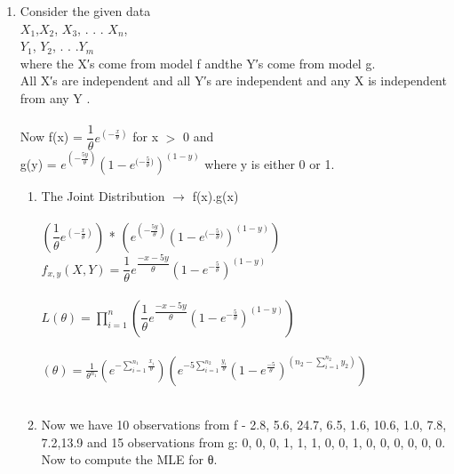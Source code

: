 \documentclass[11pt]{article}
\begin{document}
\begin{enumerate}
\begin{enumerate}
\end{enumerate}


\item Consider the given data\\
 ${X_1}$,${ X_2}$, ${X_3}$, . . . ${X_n}$,\\
$ {Y_1}$, ${Y_2}$, . . .${ Y_m}$\\
 where the X′s come from model f andthe Y′s come from model g.\\
 
 All X′s are independent and all Y′s are independent and any X is independent from any Y .\\\\

 
 Now f(x) = $\dfrac{1}{\theta} e^{({-\frac{x}{\theta}})}$ for x $>$ 0 and \\
 
 g(y) = $ e^{({-\frac{5y}{\theta}})}({1 - e^{({−\frac{5}{\theta})}}})^{(1-y)}$ where y is either 0 or 1.\\
 

 
 \begin{enumerate}

\item
The Joint Distribution $\rightarrow$ f(x).g(x) \\\\

$(\dfrac{1}{\theta} e^{({-\frac{x}{\theta}})})$ * $( e^{({-\frac{5y}{\theta}})}({1 - e^{({−\frac{5}{\theta})}}})^{(1-y)})$\\

$f_{x,y} (X,Y) = \dfrac{1}{\theta} e^{\dfrac{-x-5y}{\theta}} ({1 - e^{-\frac{5}{\theta}}})^{(1-y)}$\\\\

$ L(\theta) = \prod_{i=1}^{n}(\dfrac{1}{\theta}e^{\dfrac{-x-5y}{\theta}}({1 - e^{-\frac{5}{\theta}}})^{(1-y)})$\\\\

$\left(\theta\right)=\frac{1}{\theta ^{n_1}} \left(e^{-\sum_{i=1}^{n_1}\frac {x_i}{\theta}}\right)\left(e^{-5\sum_{i=1}^{n_2}\frac {y_i}{\theta}}\left(1-e^{\frac{-5}{\theta}}\right)^{\left(n_2-\sum_{i=1}^{n_2}y_2\right)}\right)$\\\\


\item
Now we have 10 observations from f - 2.8, 5.6, 24.7, 6.5, 1.6, 10.6, 1.0, 7.8, 7.2,13.9 
and 15 observations from g: 0, 0, 0, 1, 1, 1, 0, 0, 1, 0, 0, 0, 0, 0, 0. 
Now to compute the MLE for θ.\\\\


\end{enumerate}
\end{enumerate}
\end{document}
